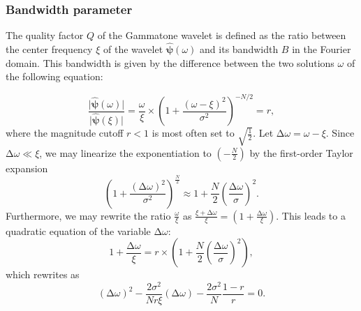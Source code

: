 \documentclass[smallextended]{svjour3}
\begin{document}
\subsubsection*{Bandwidth parameter}

The quality factor $Q$ of the Gammatone wavelet is defined as the
ratio between the center frequency $\xi$ of the wavelet $\boldsymbol{\hat{\psi}}(\omega)$
and its bandwidth $B$ in the Fourier domain. This bandwidth is given
by the difference between the two solutions $\omega$ of the following
equation:

\[
\dfrac{\vert\boldsymbol{\hat{\psi}}(\omega)\vert}{\vert\boldsymbol{\hat{\psi}}(\xi)\vert}
=
\dfrac{\omega}{\xi}\times
\left(1+\dfrac{\left(\omega-\xi\right)^{2}}{\sigma^{2}}\right)^{-N/2}=r,
\]
where the magnitude cutoff $r<1$ is most
often set to $\sqrt{\frac{1}{2}}$. Let $\mathrm{\Delta}\omega=\omega-\xi$.
Since $\mathrm{\Delta}\omega\ll\xi$, we may linearize the exponentiation to $(-\tfrac{N}{2})$ by the first-order Taylor expansion
\[
\left(1 + \frac{(\mathrm{\Delta}\omega)^2}{\sigma^2}\right)^{\frac{N}{2}} 
\approx
1 + \frac{N}{2} \left(\frac{\mathrm{\Delta}\omega}{\sigma}\right)^2.
\]
Furthermore, we may rewrite the ratio $\frac{\omega}{\xi}$ as $\frac{\xi + \mathrm{\Delta}\omega}{\xi} = (1 + \frac{\mathrm{\Delta}{\omega}}{\xi})$.
This leads to a quadratic equation
of the variable $\mathrm{\Delta}\omega$:
\[
1 + \dfrac{\mathrm{\Delta}\omega}{\xi}
=
r
\times
\left(1 + \dfrac{N}{2} \left(\dfrac{\mathrm{\Delta}\omega}{\sigma}\right)^2 \right),
\]
which rewrites as
\[
(\mathrm{\Delta}\omega)^2
- \dfrac{2\sigma^2}{Nr\xi} (\mathrm{\Delta}\omega)
- \dfrac{2\sigma^2}{N} \dfrac{1-r}{r} = 0.
\]
\end{document}

